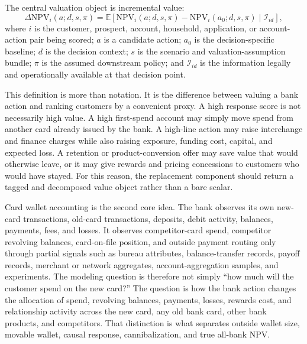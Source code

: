 \documentclass[11pt]{article}
\newcommand{\E}{\mathbb{E}}
\newcommand{\NPV}{\mathrm{NPV}}
\newcommand{\1}{\mathbf{1}}
\begin{document}
The central valuation object is incremental value:
\begin{equation}
  \Delta \NPV_i(a;d,s,\pi)
  =
  \E\left[
    \NPV_i(a;d,s,\pi)-\NPV_i(a_0;d,s,\pi)
    \mid \mathcal{I}_{id}
  \right],
  \label{eq:proposal-objective}
\end{equation}
where $i$ is the customer, prospect, account, household, application, or
account-action pair being scored; $a$ is a candidate action; $a_0$ is the
decision-specific baseline; $d$ is the decision context; $s$ is the scenario
and valuation-assumption bundle; $\pi$ is the assumed downstream policy; and
$\mathcal{I}_{id}$ is the information legally and operationally available at
that decision point.

This definition is more than notation. It is the difference between valuing a
bank action and ranking customers by a convenient proxy. A high response score
is not necessarily high value. A high first-spend account may simply move spend
from another card already issued by the bank. A high-line action may raise
interchange and finance charges while also raising exposure, funding cost,
capital, and expected loss. A retention or product-conversion offer may save
value that would otherwise leave, or it may give rewards and pricing
concessions to customers who would have stayed. For this reason, the replacement
component should return a tagged and decomposed value object rather than a bare
scalar.

Card wallet accounting is the second core idea. The bank observes its own
new-card transactions, old-card transactions, deposits, debit activity,
balances, payments, fees, and losses. It observes competitor-card spend,
competitor revolving balances, card-on-file position, and outside payment
routing only through partial signals such as bureau attributes, balance-transfer
records, payoff records, merchant or network aggregates, account-aggregation
samples, and experiments. The modeling question is therefore not simply
``how much will the customer spend on the new card?'' The question is how the
bank action changes the allocation of spend, revolving balances, payments,
losses, rewards cost, and relationship activity across the new card, any old
bank card, other bank products, and competitors. That distinction is what
separates outside wallet size, movable wallet, causal response, cannibalization,
and true all-bank NPV.
\end{document}

